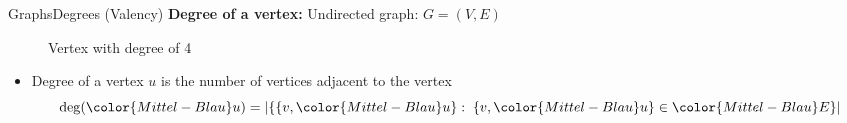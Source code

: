 \begin{frame}{Graphs}{Degrees (Valency)}
  \textbf{Degree of a vertex:} Undirected graph:
         {\color{Mittel-Blau}$G = (V , E)$}
  \begin{figure}
    \begin{adjustbox}{width=0.325\linewidth}
      
    \end{adjustbox}
    \caption{Vertex with degree of 4}
    \label{fig:graph:degree_undirected}
  \end{figure}       
  \begin{itemize}
    \item<3->
      {\color{Mittel-Blau}Degree} of a vertex {\color{Mittel-Blau}$u$}
      is the number of {\color{Mittel-Blau}vertices} adjacent to the
      vertex
      \begin{displaymath}
        \mathrm{deg}({\color{Mittel-Blau}u}) =
        \left\vert \{
          \{v, {\color{Mittel-Blau}u}\}
          : \; \{v, {\color{Mittel-Blau}u}\} \in {\color{Mittel-Blau}E} \} 
        \right\vert
      \end{displaymath}
  \end{itemize}
\end{frame}



